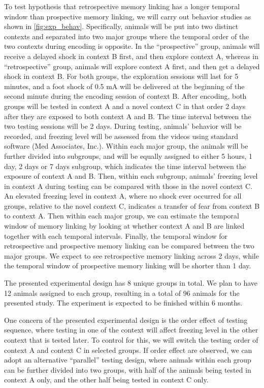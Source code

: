 \documentclass[master.tex]{subfiles}
\begin{document}
To test hypothesis that retrospective memory linking has a longer temporal
window than prospective memory linking, we will carry out behavior studies as
shown in \autoref{fig:exp_behav}. Specifically, animals will be put into two
distinct contexts and separated into two major groups where the temporal order
of the two contexts during encoding is opposite. In the ``prospective'' group,
animals will receive a delayed shock in context B first, and then explore
context A, whereas in ``retrospective'' group, animals will explore context A
first, and then get a delayed shock in context B. For both groups, the
exploration sessions will last for 5 minutes, and a foot shock of 0.5 mA will be
delivered at the beginning of the second minute during the encoding session of
context B. After encoding, both groups will be tested in context A and a novel
context C in that order 2 days after they are exposed to both context A and B.
The time interval between the two testing sessions will be 2 days. During
testing, animals' behavior will be recorded, and freezing level will be assessed
from the videos using standard software (Med Associates, Inc.). Within each
major group, the animals will be further divided into subgroups, and will be
equally assigned to either 5 hours, 1 day, 2 days or 7 days subgroup, which
indicates the time interval between the exposure of context A and B. Then,
within each subgroup, animals' freezing level in context A during testing can be
compared with those in the novel context C. An elevated freezing level in
context A, where no shock ever occurred for all groups, relative to the novel
context C, indicates a transfer of fear from context B to context A. Then within
each major group, we can estimate the temporal window of memory linking by
looking at whether context A and B are linked together with each temporal
intervals. Finally, the temporal window for retrospective and prospective memory
linking can be compared between the two major groups. We expect to see
retrospective memory linking across 2 days, while the temporal window of
prospective memory linking will be shorter than 1 day.

The presented experimental design has 8 unique groups in total. We plan to have
12 animals assigned to each group, resulting in a total of 96 animals for the
presented study. The experiment is expected to be finished within 6 months.

One concern of the presented experimental design is the order effect of testing
sequence, where testing in one of the context will affect freezing level in the
other context that is tested later. To control for this, we will switch the
testing order of context A and context C in selected groups. If order effect are
observed, we can adopt an alternative ``parallel'' testing design, where animals
within each group can be further divided into two groups, with half of the
animals being tested in context A only, and the other half being tested in
context C only.
\end{document}
